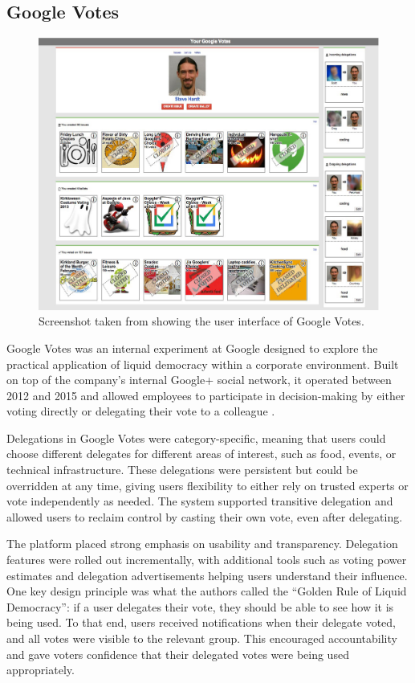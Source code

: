 \subsection{Google Votes}
\begin{figure}[H]
    \centering
    \includegraphics[width=0.8\linewidth]{../common/google_votes.png}
    \caption{Screenshot taken from \cite{hardt_google_2015} showing the user interface of Google Votes.}
\end{figure}

Google Votes was an internal experiment at Google designed to explore the practical application of liquid democracy within a corporate environment. Built on top of the company's internal Google+ social network, it operated between 2012 and 2015 and allowed employees to participate in decision-making by either voting directly or delegating their vote to a colleague \citep{hardt_google_2015}.

Delegations in Google Votes were category-specific, meaning that users could choose different delegates for different areas of interest, such as food, events, or technical infrastructure. These delegations were persistent but could be overridden at any time, giving users flexibility to either rely on trusted experts or vote independently as needed. The system supported transitive delegation and allowed users to reclaim control by casting their own vote, even after delegating.

The platform placed strong emphasis on usability and transparency. Delegation features were rolled out incrementally, with additional tools such as voting power estimates and delegation advertisements helping users understand their influence. One key design principle was what the authors called the ``Golden Rule of Liquid Democracy'': if a user delegates their vote, they should be able to see how it is being used. To that end, users received notifications when their delegate voted, and all votes were visible to the relevant group. This encouraged accountability and gave voters confidence that their delegated votes were being used appropriately.

